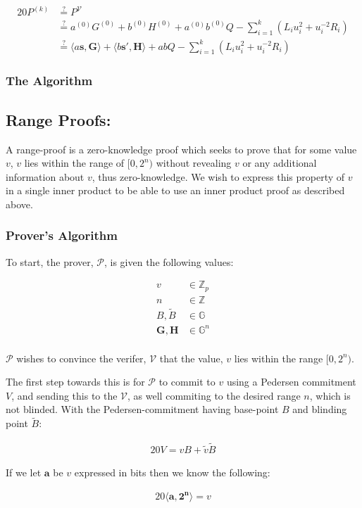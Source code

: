 \documentclass{article}
\newcommand{\eq}[1]{\begin{alignat*}{20}#1\end{alignat*}}
\newcommand{\eqn}[2]{\begin{equation}\label{#1}\begin{split}#2\end{split}\end{equation}}
\renewcommand{\vec}[1]{\boldsymbol{#1}}
\newcommand{\V}{\mathcal{V}}
\renewcommand{\P}{\mathcal{P}}
\newcommand{\G}{\mathbb{G}}
\newcommand{\Z}{\mathbb{Z}}
\newcommand{\dotp}[2]{\langle #1, #2 \rangle}
\newcommand{\tB}{\widetilde{B}}
\newcommand{\tv}{\widetilde{v}}
\begin{document}
\eq{
	P^{(k)} &\stackrel{?}{=} P^{\V} \\
	        &\stackrel{?}{=} a^{(0)}G^{(0)} + b^{(0)}H^{(0)} + a^{(0)}b^{(0)}Q - \sum^k_{i=1} (L_i u^2_i + u^{-2}_i R_i) \\
	        &\stackrel{?}{=} \dotp{a\vec{s}}{\vec{G}} + \dotp{b\vec{s'}}{\vec{H}} + abQ - \sum^k_{i=1} (L_i u^2_i + u^{-2}_i R_i)
}

\subsubsection{The Algorithm}

\subsection{Range Proofs:}\label{range-proofs}

A range-proof is a zero-knowledge proof which seeks to prove that for some value $v$, $v$ lies within the range of $[0,2^n)$ without revealing $v$ or any additional information about $v$, thus zero-knowledge. We wish to express this property of $v$ in a single inner product to be able to use an inner product proof as described above. 

\subsubsection{Prover's Algorithm}\label{prover-range-proofs}

To start, the prover, $\P$, is given the following values:

\eqn{def1}{
	v &\in \Z_p \\
	n &\in \Z\\
	B, \tB &\in \G\\
	\vec{G}, \vec{H} &\in \G^n \\
}

$\P$ wishes to convince the verifer, $\V$ that the value, $v$ lies
within the range $[0,2^n)$.

The first step towards this is for $\P$ to commit to $v$ using
a Pedersen commitment $V$, and sending this to the $\V$, as well
commiting to the desired range $n$, which is not blinded. With the
Pedersen-commitment having base-point $B$ and blinding point $\tB$:

\eq{
	V = vB + \tv \tB
}

If we let $\vec{a}$ be $v$ expressed in bits then we know the following:

\eq{
	\dotp{\vec{a}}{\vec{2^n}} = v
}
\end{document}
